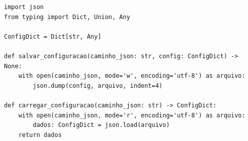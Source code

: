 \ifmostrarGabarito
\begin{verbatim}
import json
from typing import Dict, Union, Any

ConfigDict = Dict[str, Any]

def salvar_configuracao(caminho_json: str, config: ConfigDict) -> None:
    with open(caminho_json, mode='w', encoding='utf-8') as arquivo:
        json.dump(config, arquivo, indent=4)

def carregar_configuracao(caminho_json: str) -> ConfigDict:
    with open(caminho_json, mode='r', encoding='utf-8') as arquivo:
        dados: ConfigDict = json.load(arquivo)
    return dados
\end{verbatim}
\fi
